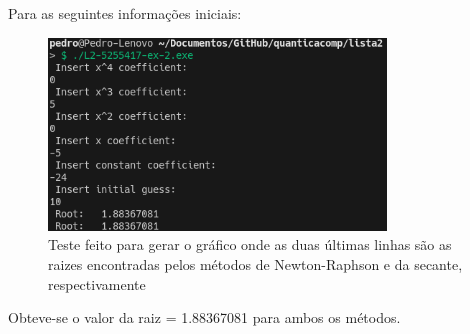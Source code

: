 \documentclass[12pt, a4paper]{article} %
\begin{document}
            Para as seguintes informa\c{c}\~oes iniciais:
            \begin{figure}[H]
                \centering
                \includegraphics[width=0.8\textwidth]{../images/results-ex-2.2-10.png}
                \caption{Teste feito para gerar o gr\'afico onde as duas \'ultimas linhas s\~ao as raizes encontradas pelos m\'etodos de Newton-Raphson e da secante, respectivamente}
            \end{figure}
            Obteve-se o valor da raiz = 1.88367081 para ambos os m\'etodos.
\end{document}
